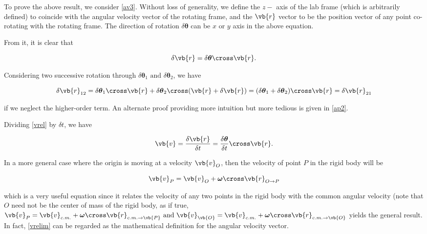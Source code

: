 \documentclass[a4paper,12pt]{report}
\begin{document}
To prove the above result, we consider \cref{av3}. Without loss of generality, we define the \(z-\) axis of the lab frame (which is arbitrarily defined) to coincide with the angular velocity vector of the rotating frame, and the \(\vb{r} \) vector to be the position vector of any point co-rotating with the rotating frame. The direction of rotation \(\delta \boldsymbol{\theta } \) can be \(x \text { or } y\) axis in the above equation.

 From it, it is clear that

\begin{equation}
	\delta \vb{r} = \delta \boldsymbol{\theta }  \cross \vb{r} . \label{vrel} 
\end{equation}

Considering two successive rotation through \(\delta \boldsymbol{\theta } _{1} \text{ and }  \delta \boldsymbol{\theta } _{2}  \), we have 

\begin{equation}
	\delta \vb{r} _{12} = \delta \boldsymbol{\theta } _{1} \cross \vb{r} + \delta \boldsymbol{\theta } _{2}  \cross (\vb{r} +\delta \vb{r} ) = (\delta \boldsymbol{\theta } _{1}  + \delta \boldsymbol{\theta } _{2}  ) \cross \vb{r} = \delta \vb{r} _{21}  
\end{equation}

if we neglect the higher-order term. An alternate proof providing more intuition but more tedious is given in \cref{ap2}.

Dividing \cref{vrel} by \(\delta t\), we have

\begin{equation}
	\vb{v} = \frac{\delta \vb{r}  }{\delta t} = \frac{\delta \boldsymbol{\theta } }{\delta t} \cross \vb{r} .
\end{equation}


In a more general case where the origin is moving at a velocity \(\vb{v} _{O} \), then the velocity of point \(P\) in the rigid body will be 

\begin{equation}
	\vb{v} _{P} = \vb{v} _{O} + \boldsymbol{\omega } \cross \vb{r} _{O \rightarrow  P} \label{vrelim} 
\end{equation}

which is a very useful equation since it relates the velocity of any two points in the rigid body with the common angular velocity (note that \(O \) need not be the center of mass of the rigid body, as if true, \(\vb{v} _{P} = \vb{v} _{c.m. } + \boldsymbol{\omega } \cross \vb{r} _{c.m. \rightarrow \vb{P} } \text{ and } \vb{v} _{\vb{O}}  = \vb{v} _{c.m. } + \boldsymbol{\omega } \cross \vb{r} _{c.m. \rightarrow \vb{O} }   \) yields the general result. In fact, \cref{vrelim} can be regarded as the mathematical definition for the angular velocity vector.
\end{document}
